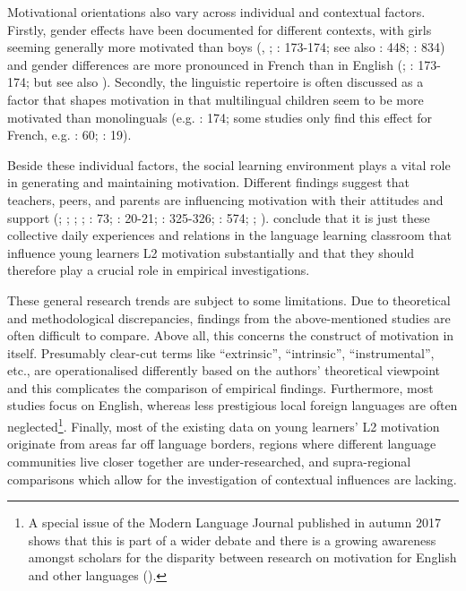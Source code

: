 \documentclass[output=paper]{langsci/langscibook}
\begin{document}
Motivational orientations also vary across individual and contextual factors. Firstly, gender effects have been documented for different contexts, with girls seeming generally more motivated than boys (\citealt{Heinzmann2009}, \citealt{Henry2009,Henry2010}; \citealt{BruehwilerLePapeRacine2017}: 173-174; see also \citealt{DoernyeiCsizer2002}: 448; \citealt{CourtneyEtAl2017}: 834) and gender differences are more pronounced in French than in English (\citealt{Holder2005}; \citealt{BruehwilerLePapeRacine2017}: 173-174; but see also \citealt{DewaeleEtAl2016}). Secondly, the linguistic repertoire is often discussed as a factor that shapes motivation in that multilingual children seem to be more motivated than monolinguals (e.g. \citealt{BruehwilerLePapeRacine2017}: 174; some studies only find this effect for French, e.g. \citealt{Stoeckli2004}: 60; \citealt{Heinzmann2010}: 19). 

Beside these individual factors, the social learning environment plays a vital role in generating and maintaining motivation. Different findings suggest that teachers, peers, and parents are influencing motivation with their attitudes and support (\citealt{NoelsEtAl1999}; \citealt{CsizerKormos2008,CsizerKormos2009}; \citealt{HusfeldtBaderLehmann2009}; \citealt{TaguchiEtAl2009}; \citealt{Iwaniec2014}: 73; \citealt{PeyerEtAl2016}: 20-21; \citealt{PfenningerSingleton2016}: 325-326; \citealt{Busse2017}: 574; \citealt{SugitaMcEownEtAl2017}; \citealt{WiedenkellerLenz2019}). \citet[336]{PfenningerSingleton2016} conclude that it is just these collective daily experiences and relations in the language learning classroom that influence young learners L2 motivation substantially and that they should therefore play a crucial role in empirical investigations.

These general research trends are subject to some limitations. Due to theoretical and methodological discrepancies, findings from the above-mentioned studies are often difficult to compare. Above all, this concerns the construct of motivation in itself. Presumably clear-cut terms like “extrinsic”, “intrinsic”, “instrumental”, etc., are operationalised differently based on the authors’ theoretical viewpoint and this complicates the comparison of empirical findings. Furthermore, most studies focus on English, whereas less prestigious local foreign languages are often neglected\footnote{A special issue of the Modern Language Journal published in autumn 2017 shows that this is part of a wider debate and there is a growing awareness amongst scholars for the disparity between research on motivation for English and other languages (\citealt{UshiodaDoernyei2017}).}. Finally, most of the existing data on young learners’ L2 motivation originate from areas far off language borders, regions where different language communities live closer together are under-researched, and supra-regional comparisons which allow for the investigation of contextual influences are lacking.
\end{document}
